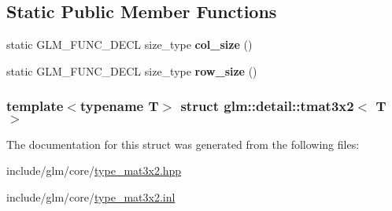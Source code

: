 \subsection*{\-Static \-Public \-Member \-Functions}
\begin{DoxyCompactItemize}
\item 
\hypertarget{structglm_1_1detail_1_1tmat3x2_ad7d1e84cf2bece265c157fa05ded68ae}{static \-G\-L\-M\-\_\-\-F\-U\-N\-C\-\_\-\-D\-E\-C\-L size\-\_\-type {\bfseries col\-\_\-size} ()}\label{structglm_1_1detail_1_1tmat3x2_ad7d1e84cf2bece265c157fa05ded68ae}

\item 
\hypertarget{structglm_1_1detail_1_1tmat3x2_a5a957db4e6d70144fafa69398f66fa34}{static \-G\-L\-M\-\_\-\-F\-U\-N\-C\-\_\-\-D\-E\-C\-L size\-\_\-type {\bfseries row\-\_\-size} ()}\label{structglm_1_1detail_1_1tmat3x2_a5a957db4e6d70144fafa69398f66fa34}

\end{DoxyCompactItemize}
\subsubsection*{template$<$typename \-T$>$ struct glm\-::detail\-::tmat3x2$<$ T $>$}



\-The documentation for this struct was generated from the following files\-:\begin{DoxyCompactItemize}
\item 
include/glm/core/\hyperlink{type__mat3x2_8hpp}{type\-\_\-mat3x2.\-hpp}\item 
include/glm/core/\hyperlink{type__mat3x2_8inl}{type\-\_\-mat3x2.\-inl}\end{DoxyCompactItemize}
